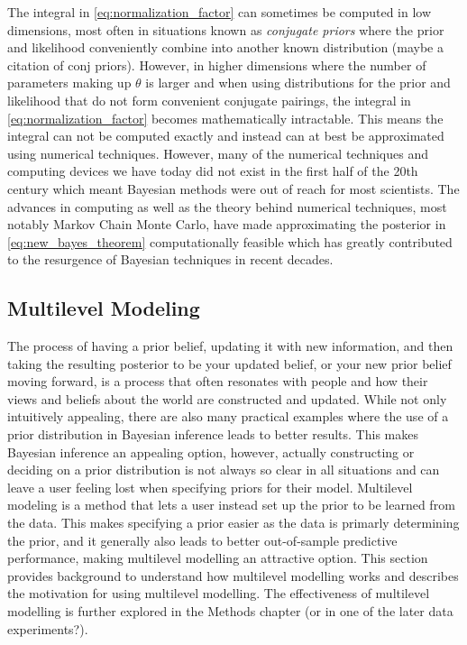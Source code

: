The integral in \ref{eq:normalization_factor} can sometimes be computed in low dimensions, most often in situations known as \textit{conjugate priors} where the prior and likelihood conveniently combine into another known distribution (maybe a citation of conj priors). However, in higher dimensions where the number of parameters making up $\theta$ is larger and when using distributions for the prior and likelihood that do not form convenient conjugate pairings, the integral in \ref{eq:normalization_factor} becomes mathematically intractable. This means the integral can not be computed exactly and instead can at best be approximated using numerical techniques. However, many of the numerical techniques and computing devices we have today did not exist in the first half of the 20th century which meant Bayesian methods were out of reach for most scientists. The advances in computing as well as the theory behind numerical techniques, most notably Markov Chain Monte Carlo, have made approximating the posterior in \ref{eq:new_bayes_theorem} computationally feasible which has greatly contributed to the resurgence of Bayesian techniques in recent decades.

\subsection{Multilevel Modeling}

The process of having a prior belief, updating it with new information, and then taking the resulting posterior to be your updated belief, or your new prior belief moving forward, is a process that often resonates with people and how their views and beliefs about the world are constructed and updated. While not only intuitively appealing, there are also many practical examples where the use of a prior distribution in Bayesian inference leads to better results. This makes Bayesian inference an appealing option, however, actually constructing or deciding on a prior distribution is not always so clear in all situations and can leave a user feeling lost when specifying priors for their model. Multilevel modeling is a method that lets a user instead set up the prior to be learned from the data. This makes specifying a prior easier as the data is primarly determining the prior, and it generally also leads to better out-of-sample predictive performance, making multilevel modelling an attractive option. This section provides background to understand how multilevel modelling works and describes the motivation for using multilevel modelling. The effectiveness of multilevel modelling is further explored in the Methods chapter (or in one of the later data experiments?).

